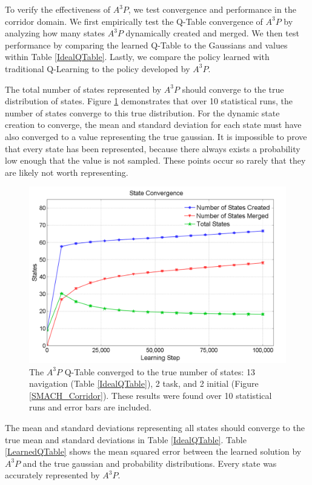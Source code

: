 \documentclass[letterpaper, 10 pt, conference]{ieeeconf}  %
\begin{document}
To verify the effectiveness of $A^3P$, we test convergence and performance in the corridor domain. We first empirically test the Q-Table convergence of $A^3P$ by analyzing how many states $A^3P$ dynamically created and merged. We then test performance by comparing the learned Q-Table to the Gaussians and values within Table \ref{IdealQTable}. Lastly, we compare the policy learned with traditional Q-Learning to the policy developed by $A^3P$. 

The total number of states represented by $A^3P$ should converge to the true distribution of states. Figure \ref{State_Convergence} demonstrates that over 10 statistical runs, the number of states converge to this true distribution. For the dynamic state creation to converge, the mean and standard deviation for each state must have also converged to a value representing the true gaussian. It is impossible to prove that every state has been represented, because there always exists a probability low enough that the value is not sampled. These points occur so rarely that they are likely not worth representing. 

\begin{figure}
\centering
\includegraphics[width=1.0\columnwidth]{state_convergence}
\caption{The $A^3P$ Q-Table converged to the true number of states: 13 navigation (Table \ref{IdealQTable}), 2 task, and 2 initial (Figure \ref{SMACH_Corridor}). These results were found over 10 statistical runs and error bars are included.}
\label{State_Convergence}
\end{figure}

The mean and standard deviations representing all states should converge to the true mean and standard deviations in Table \ref{IdealQTable}. Table \ref{LearnedQTable} shows the mean squared error between the learned solution by $A^3P$ and the true gaussian and probability distributions. Every state was accurately represented by $A^3P$. %
\end{document}
